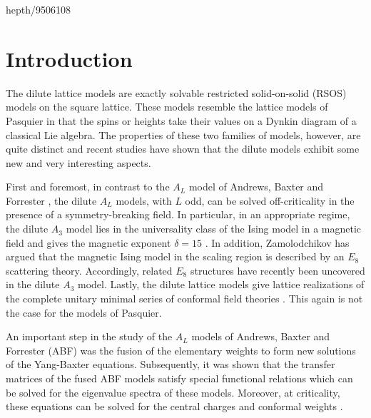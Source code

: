 \begin{abstract}
The fusion procedure is implemented for the dilute $A_L$ lattice
models and a fusion hierarchy of functional equations with
an $su(3)$ structure is derived for the fused transfer matrices.
We also present the Bethe ansatz equations for the dilute $A_L$ lattice
models and discuss their connection with the fusion hierarchy.
The solution of the fusion hierarchy for the eigenvalue spectra
of the dilute $A_L$ lattice models will be presented in a subsequent
paper.
\end{abstract}

\bigskip
hepth/9506108
\bigskip

\section{Introduction}
\setcounter{equation}{0}

The dilute \ade lattice models \cite{WNS:92,Roche:92} are exactly solvable
\cite{Baxter:82} restricted solid-on-solid (RSOS) models on the square
lattice. These
models resemble the \ade lattice models of Pasquier \cite{Pasquier:87} in
that the spins or heights take their values on a Dynkin diagram of a
classical \ade Lie algebra. The properties of these two families of \ade
models, however, are quite distinct and recent studies have shown that the
dilute \ade models exhibit some new and very interesting aspects.

First and foremost, in contrast to the $A_L$ model of Andrews, Baxter and
Forrester \cite{ABF:84}, the dilute $A_L$ models, with $L$ odd, can be
solved \cite{WPSN:94} off-criticality in the presence of a
symmetry-breaking field. In particular, in an appropriate regime, the
dilute $A_3$ model lies in the universality class of the Ising model in a
magnetic field and gives the magnetic exponent $\delta=15$
\cite{WPSN:94}. In addition, Zamolodchikov \cite{Zam:89} has argued that
the magnetic Ising model in the scaling region is described by an
$E_8$ scattering
theory. Accordingly, related $E_8$ structures have recently been uncovered
\cite{BNW:94, WaPe:95} in the dilute $A_3$ model. Lastly, the dilute \ade
lattice models give \cite{OBPe:95} lattice realizations of the complete
unitary minimal series of conformal field theories \cite{CIZ:87}. This
again is not the case for the \ade models of Pasquier.

An important step in the study of the $A_L$ models of Andrews, Baxter and
Forrester (ABF) was the fusion \cite{DJMO:86} of the elementary weights to
form new solutions of the Yang-Baxter equations. Subsequently, it was shown
\cite{BaRe:89} that the transfer matrices of the fused ABF models satisfy
special functional relations which can be solved for the eigenvalue
spectra of these models. Moreover, at criticality, these equations can be
solved for the central charges \cite{BaRe:89} and conformal weights
\cite{KlPe:92}.

